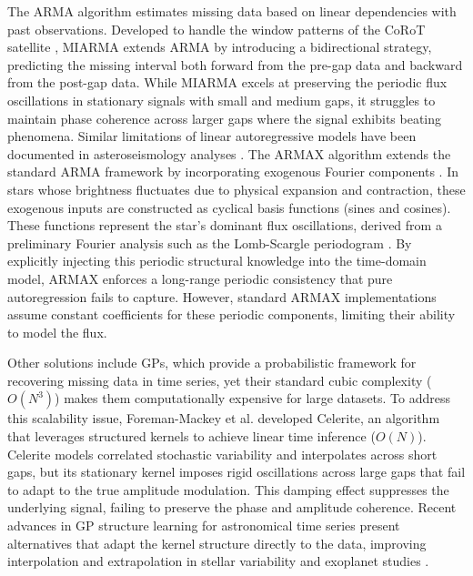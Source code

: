 \documentclass[a4paper,fleqn]{cas-sc}
\begin{document}
The ARMA algorithm \cite{box2015time} estimates missing data based on linear dependencies with past observations. Developed to handle the window patterns of the CoRoT satellite \cite{baglin2008corot}, MIARMA \cite{pascual2015miarma} extends ARMA by introducing a bidirectional strategy, predicting the missing interval both forward from the pre-gap data and backward from the post-gap data. While MIARMA excels at preserving the periodic flux oscillations in stationary signals with small and medium gaps, it struggles to maintain phase coherence across larger gaps where the signal exhibits beating phenomena. Similar limitations of linear autoregressive models have been documented in asteroseismology analyses \cite{pascual2015miarma, pascual2018impact}. The ARMAX algorithm extends the standard ARMA framework by incorporating exogenous Fourier components \cite{hyndman2018forecasting}. In stars whose brightness fluctuates due to physical expansion and contraction, these exogenous inputs are constructed as cyclical basis functions (sines and cosines). These functions represent the star's dominant flux oscillations, derived from a preliminary Fourier analysis such as the Lomb-Scargle periodogram \cite{lomb1976least,fons2025lscd}. By explicitly injecting this periodic structural knowledge into the time-domain model, ARMAX enforces a long-range periodic consistency that pure autoregression fails to capture. However, standard ARMAX implementations assume constant coefficients for these periodic components, limiting their ability to model the flux.

Other solutions include GPs, which provide a probabilistic framework for recovering missing data in time series, yet their standard cubic complexity ($O(N^3)$) makes them computationally expensive for large datasets. To address this scalability issue, Foreman-Mackey et al. \cite{foreman2017fast} developed Celerite, an algorithm that leverages structured kernels to achieve linear time inference ($O(N)$). Celerite models correlated stochastic variability and interpolates across short gaps, but its stationary kernel imposes rigid oscillations across large gaps that fail to adapt to the true amplitude modulation. This damping effect suppresses the underlying signal, failing to preserve the phase and amplitude coherence. Recent advances in GP structure learning for astronomical time series present alternatives that adapt the kernel structure directly to the data, improving interpolation and extrapolation in stellar variability and exoplanet studies \cite{boettner2025gallifrey}.
\end{document}
